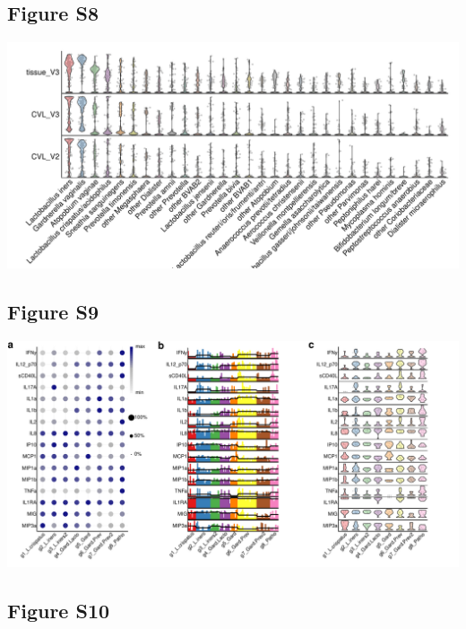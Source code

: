 \documentclass[
]{article}
\begin{document}
\clearpage

\hypertarget{figure-s8}{%
\subsection{Figure S8}\label{figure-s8}}

\includegraphics[width=1\linewidth]{manuscript_template_files/figure-latex/unnamed-chunk-18-1}

\clearpage

\hypertarget{figure-s9}{%
\subsection{Figure S9}\label{figure-s9}}

\includegraphics[width=1\linewidth]{manuscript_template_files/figure-latex/unnamed-chunk-19-1}

\clearpage

\hypertarget{figure-s10}{%
\subsection{Figure S10}\label{figure-s10}}
\end{document}
